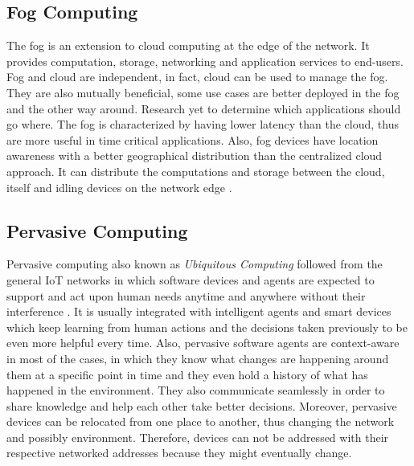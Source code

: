 \subsection{Fog Computing}

The fog is an extension to cloud computing at the edge of the network. It provides computation, storage, networking and application services to end-users. Fog and cloud are independent, in fact, cloud can be used to manage the fog. They are also mutually beneficial, some use cases are better deployed in the fog and the other way around. Research yet to determine which applications should go where. The fog is characterized by having lower latency than the cloud, thus are more useful in time critical applications. Also, fog devices have location awareness with a better geographical distribution than the centralized cloud approach. It can distribute the computations and storage between the cloud, itself and idling devices on the network edge \cite{7498684}.

\subsection{Pervasive Computing} 
 Pervasive computing also known as \textit{Ubiquitous Computing} followed from the general IoT networks in which software devices and agents are expected to support and act upon human needs anytime and anywhere without their interference \cite{Chen:2003:OCP:991804.991806}. It is usually integrated with intelligent agents and smart devices which keep learning from human actions and the decisions taken previously to be even more helpful every time. Also, pervasive software agents are context-aware in most of the cases, in which they know what changes are happening around them at a specific point in time and they even hold a history of what has happened in the environment. They also communicate seamlessly in order to share knowledge and help each other take better decisions. Moreover, pervasive devices can be relocated from one place to another, thus changing the network and possibly environment. Therefore, devices can not be addressed with their respective networked addresses because they might eventually change. 

